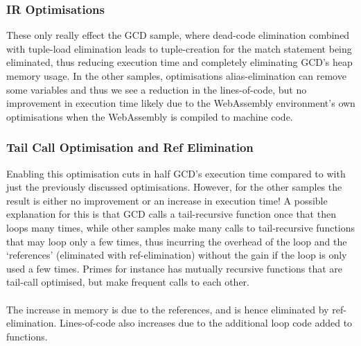\subsubsection{IR Optimisations}
These only really effect the GCD sample, where dead-code elimination combined with tuple-load elimination leads to tuple-creation for the match statement being eliminated, thus reducing execution time and completely eliminating GCD's heap memory usage. In the other samples, optimisations alias-elimination can remove some variables and thus we see a reduction in the lines-of-code, but no improvement in execution time likely due to the WebAssembly environment's own optimisations when the WebAssembly is compiled to machine code.

\subsubsection{Tail Call Optimisation and Ref Elimination}
Enabling this optimisation cuts in half GCD's execution time compared to with just the previously discussed optimisations. However, for the other samples the result is either no improvement or an increase in execution time! A possible explanation for this is that GCD calls a tail-recursive function once that then loops many times, while other samples make many calls to tail-recursive functions that may loop only a few times, thus incurring the overhead of the loop and the `references' (eliminated with ref-elimination) without the gain if the loop is only used a few times. Primes for instance has mutually recursive functions that are tail-call optimised, but make frequent calls to each other.
\\\\
The increase in memory is due to the references, and is hence eliminated by ref-elimination. Lines-of-code also increases due to the additional loop code added to functions.



